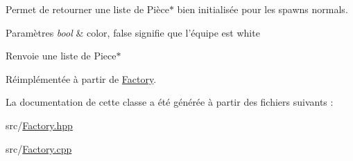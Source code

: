 Permet de retourner une liste de Pièce$\ast$ bien initialisée pour les spawns normals. 


\begin{DoxyParams}{Paramètres}
{\em bool} & color, false signifie que l'équipe est white \\
\hline
\end{DoxyParams}
\begin{DoxyReturn}{Renvoie}
une liste de Piece$\ast$ 
\end{DoxyReturn}


Réimplémentée à partir de \hyperlink{class_factory_a90f20f663caa6e5a5370465d3014630f}{Factory}.



La documentation de cette classe a été générée à partir des fichiers suivants \-:\begin{DoxyCompactItemize}
\item 
src/\hyperlink{_factory_8hpp}{Factory.\-hpp}\item 
src/\hyperlink{_factory_8cpp}{Factory.\-cpp}\end{DoxyCompactItemize}
